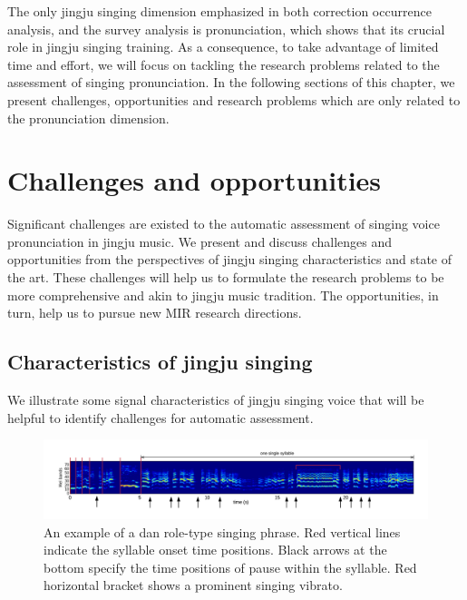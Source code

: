 The only jingju singing dimension emphasized in both correction occurrence analysis, and the survey analysis is pronunciation, which shows that its crucial role in jingju singing training. As a consequence, to take advantage of limited time and effort, we will focus on tackling the research problems related to the assessment of singing pronunciation. In the following sections of this chapter, we present challenges, opportunities and research problems which are only related to the pronunciation dimension.

\section{Challenges and opportunities}\label{sec:ch3:challenges_opportunities}

Significant challenges are existed to the automatic assessment of singing voice pronunciation in jingju music. We present and discuss challenges and opportunities from the perspectives of jingju singing characteristics and state of the art. These challenges will help us to formulate the research problems to be more comprehensive and akin to jingju music tradition. The opportunities, in turn, help us to pursue new \gls{MIR} research directions. 

\subsection{Characteristics of jingju singing}\label{sec:ch3:char_singing}

We illustrate some signal characteristics of jingju singing voice that will be helpful to identify challenges for automatic assessment. 

\begin{landscape}
\mbox{}\vfill
\begin{figure}[ht!]
\includegraphics[width=1.8\textwidth]{figs/spectro_vis/ch3_jingju_char.png}
\caption{An example of a \gls{dan} role-type singing phrase. Red vertical lines indicate the syllable onset time positions. Black arrows at the bottom specify the time positions of pause within the syllable. Red horizontal bracket shows a prominent singing vibrato.}
\label{fig:jingju_char}
\end{figure}
\vfill
\end{landscape}

